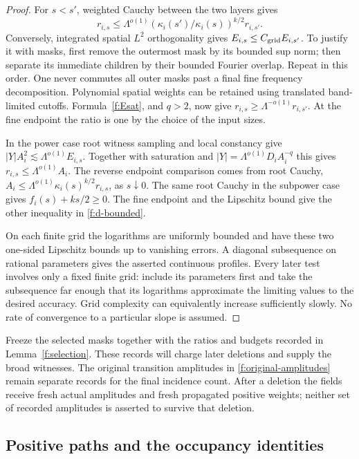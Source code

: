 \begin{proof}
For $s<s'$, weighted Cauchy between the two layers gives
\[
 r_{i,s}\le\Lambda^{o(1)}
             (\kappa_i(s')/\kappa_i(s))^{k/2}r_{i,s'}.
\]
Conversely, integrated spatial $L^2$ orthogonality gives
$E_{i,s}\le C_{\rm grid}E_{i,s'}$. To justify it with masks, first
remove the outermost mask by its bounded sup norm; then separate its
immediate children by their bounded Fourier overlap. Repeat in this
order. One never commutes all outer masks past a final fine frequency
decomposition. Polynomial spatial weights can be retained using
translated band-limited cutoffs. Formula~\eqref{f:Esat}, and $q>2$,
now give $r_{i,s}\ge\Lambda^{-o(1)}r_{i,s'}$. At the fine endpoint
the ratio is one by the choice of the input sizes.

In the power case root witness sampling and local constancy give
$|Y|A_i^2\lesssim\Lambda^{o(1)}E_{i,s}$. Together with saturation
and $|Y|=\Lambda^{o(1)}D_iA_i^{-q}$ this gives
$r_{i,s}\le\Lambda^{o(1)}A_i$. The reverse endpoint comparison
comes from root Cauchy,
$A_i\le\Lambda^{o(1)}\kappa_i(s)^{k/2}r_{i,s}$, as $s\downarrow0$.
The same root Cauchy in the subpower case gives
$f_i(s)+ks/2\ge0$. The fine endpoint and the Lipschitz bound give
the other inequality in \eqref{f:d-bounded}.

On each finite grid the logarithms are uniformly bounded and have
these two one-sided Lipschitz bounds up to vanishing errors. A
diagonal subsequence on rational parameters gives the asserted
continuous profiles. Every later test involves only a fixed finite
grid: include its parameters first and take the subsequence far
enough that its logarithms approximate the limiting values to the
desired accuracy. Grid complexity can equivalently increase
sufficiently slowly. No rate of convergence to a particular slope is
assumed.
\end{proof}

Freeze the selected masks together with the ratios and budgets recorded
in Lemma~\ref{f:selection}. These records will charge later deletions
and supply the broad witnesses. The original transition amplitudes in
\eqref{f:original-amplitudes} remain separate records for the final
incidence count. After a deletion the fields receive fresh actual
amplitudes and fresh propagated positive weights; neither set of
recorded amplitudes is asserted to survive that deletion.

\subsection{Positive paths and the occupancy identities}

